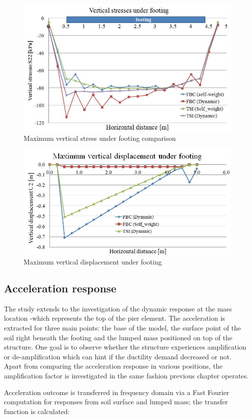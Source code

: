 \begin{figure}[!h]
	\centering
	\includegraphics[width=0.7\linewidth]{"vert stresses"}
	\caption{Maximum vertical stress under footing comparison}
	\label{vert}
\end{figure}

\begin{figure}[!h]
	\centering
	\includegraphics[width=0.7\linewidth]{"displacement"}
	\caption{Maximum vertical displacement under footing}
	\label{inputacc}
\end{figure}

\newpage
\subsection{Acceleration response}
The study extends to the investigation of the dynamic response at the mass location -which represents the top of the pier element. The acceleration is extracted for three main points: the base of the model, the surface point of the soil right beneath the footing and the lumped mass positioned on top of the structure. One goal is to observe whether the structure experiences amplification or de-amplification which can hint if the ductility demand decreased or not. Apart from comparing the acceleration response in various positions, the amplification factor is investigated in the same fashion previous chapter operates.

Acceleration outcome is transferred in frequency domain via a Fast Fourier computation for responses from soil surface and lumped mass; the transfer function is calculated:

